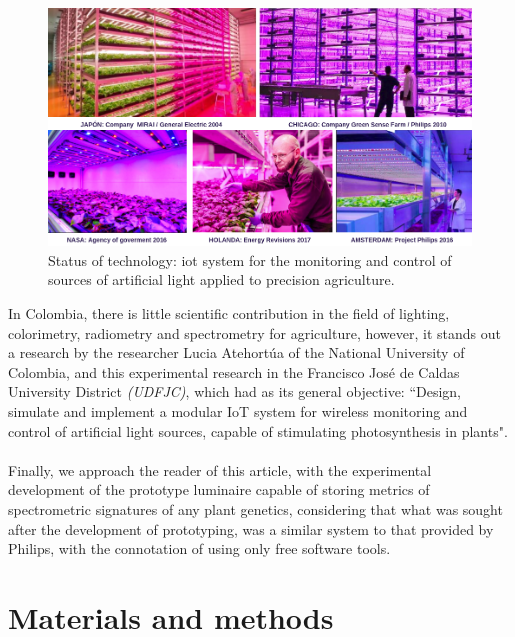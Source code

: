 \documentclass[letterpaper,12pt,twoside]{articleingud}
\begin{document}
\begin{figure}
 \begin{center}
  \includegraphics[width=16cm]{images/refMundialPAR.png}
   \caption{Status of technology: iot system for the monitoring and control of sources of artificial light applied to precision agriculture.\cite{diegojaviermenaamado2018} }
  \end{center}
\end{figure}
In Colombia, there is little scientific contribution in the field of lighting, colorimetry, radiometry and spectrometry for agriculture, however, it stands out a research by the researcher Lucia Atehortúa of the National University of Colombia, and this experimental research in the Francisco José de Caldas University District \textit{(UDFJC)}, which had as its general objective: ``Design, simulate and implement a modular IoT system for wireless monitoring and control of artificial light sources, capable of stimulating photosynthesis in plants".\cite{UNAL}
\\\\
Finally, we approach the reader of this article, with the experimental development of the prototype luminaire capable of storing metrics of spectrometric signatures of any plant genetics, considering that what was sought after the development of prototyping, was a similar system to that provided by Philips, with the connotation of using only free software tools.
\section{Materials and methods}
\end{document}
